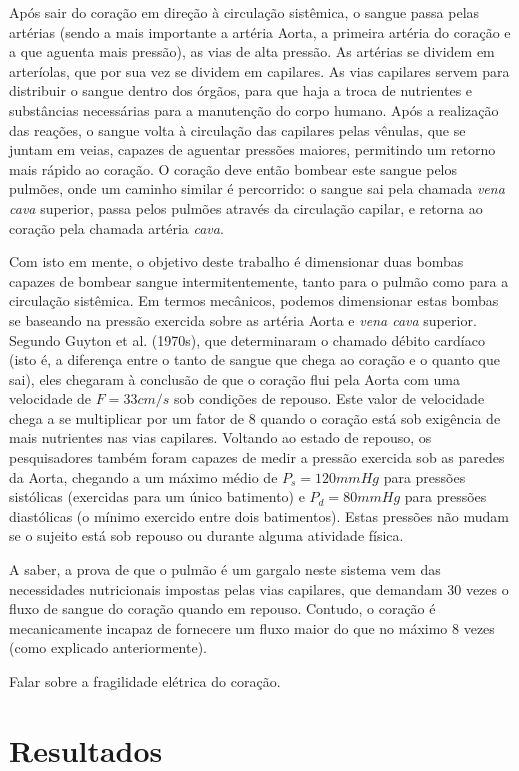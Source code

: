 \documentclass[12pt, a4paper, twoside]{article}
\begin{document}
Após sair do coração em direção à circulação sistêmica, o sangue passa pelas artérias (sendo a mais importante a artéria Aorta, a primeira artéria do coração e a que aguenta mais pressão), as vias de alta pressão. As artérias se dividem em arteríolas, que por sua vez se dividem em capilares. As vias capilares servem para distribuir o sangue dentro dos órgãos, para que haja a troca de nutrientes e substâncias necessárias para a manutenção do corpo humano. Após a realização das reações, o sangue volta à circulação das capilares pelas vênulas, que se juntam em veias, capazes de aguentar pressões maiores, permitindo um retorno mais rápido ao coração. O coração deve então bombear este sangue pelos pulmões, onde um caminho similar é percorrido: o sangue sai pela chamada \textit{vena cava} superior, passa pelos pulmões através da circulação capilar, e retorna ao coração pela chamada artéria \textit{cava}.

Com isto em mente, o objetivo deste trabalho é dimensionar duas bombas capazes de bombear sangue intermitentemente, tanto para o pulmão como para a circulação sistêmica. Em termos mecânicos, podemos dimensionar estas bombas se baseando na pressão exercida sobre as artéria Aorta e \textit{vena cava} superior. Segundo Guyton et al. (1970s), que determinaram o chamado débito cardíaco (isto é, a diferença entre o tanto de sangue que chega ao coração e o quanto que sai), eles chegaram à conclusão de que o coração flui pela Aorta com uma velocidade de $F=33cm/s$ sob condições de repouso. Este valor de velocidade chega a se multiplicar por um fator de 8 quando o coração está sob exigência de mais nutrientes nas vias capilares. Voltando ao estado de repouso, os pesquisadores também foram capazes de medir a pressão exercida sob as paredes da Aorta, chegando a um máximo médio de $P_s=120mmHg$ para pressões sistólicas (exercidas para um único batimento) e $P_d=80mmHg$ para pressões diastólicas (o mínimo exercido entre dois batimentos). Estas pressões não mudam se o sujeito está sob repouso ou durante alguma atividade física.

A saber, a prova de que o pulmão é um gargalo neste sistema vem das necessidades nutricionais impostas pelas vias capilares, que demandam 30 vezes o fluxo de sangue do coração quando em repouso. Contudo, o coração é mecanicamente incapaz de fornecere um fluxo maior do que no máximo 8 vezes (como explicado anteriormente).

Falar sobre a fragilidade elétrica do coração.

\section{Resultados}
\end{document}
